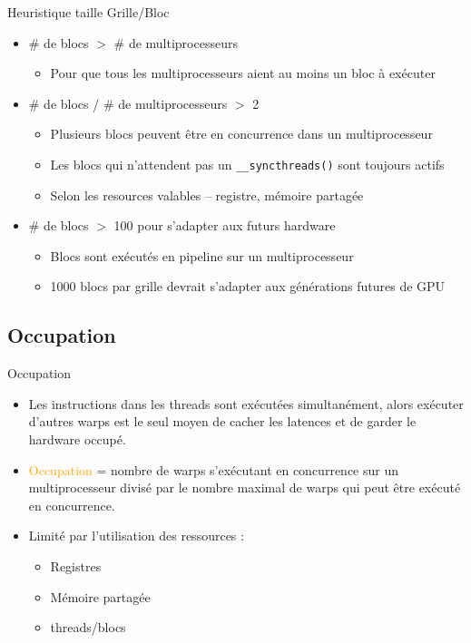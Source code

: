 \documentclass[handout,francais]{beamer}
\begin{document}
\begin{frame}{Heuristique taille Grille/Bloc}

  \begin{itemize}
  \item \# de blocs $>$ \# de multiprocesseurs
    \begin{itemize}
    \item Pour que tous les multiprocesseurs aient au moins un bloc à exécuter
    \end{itemize}
  \item \# de blocs / \# de multiprocesseurs $>$ 2
    \begin{itemize}
    \item Plusieurs blocs peuvent être en concurrence dans un multiprocesseur
    \item Les blocs qui n'attendent pas un  \texttt{\_\_syncthreads()} sont toujours actifs
    \item Selon les resources valables -- registre, mémoire partagée
    \end{itemize}
  \item \# de blocs $>$ 100 pour s'adapter aux futurs hardware
    \begin{itemize}
    \item Blocs sont exécutés en pipeline sur un multiprocesseur
    \item 1000 blocs par grille devrait s'adapter aux générations futures de GPU
    \end{itemize}
  \end{itemize}
\end{frame}

\subsection{Occupation}

\begin{frame}{Occupation}

  \begin{itemize}
  \item Les instructions dans les threads sont exécutées simultanément, alors 
    exécuter d'autres warps est le seul moyen de cacher les latences et de
    garder le hardware occupé.
  \item \textcolor{orange}{Occupation} = nombre de warps
    s'exécutant en concurrence sur un multiprocesseur divisé
    par le nombre maximal de warps qui peut être exécuté en concurrence.
  \item Limité par l'utilisation des ressources :
    \begin{itemize}
    \item Registres
    \item Mémoire partagée
    \item threads/blocs
    \end{itemize}
\end{itemize}
\end{frame}
\end{document}
